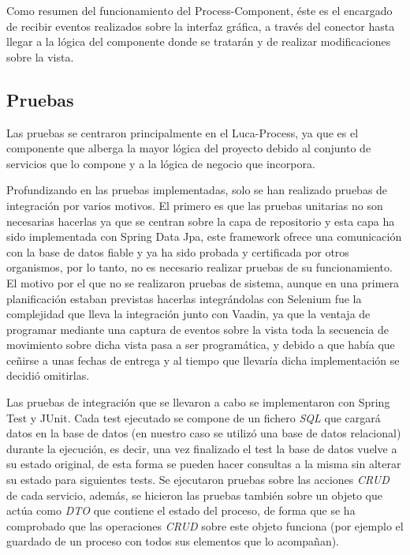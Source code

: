 Como resumen del funcionamiento del Process-Component, éste es el encargado de recibir eventos realizados sobre la interfaz gráfica, a través del conector hasta llegar a la lógica del componente donde se tratarán y de realizar modificaciones sobre la vista.

	
\subsection{Pruebas}
	
	
	Las pruebas se centraron principalmente en el Luca-Process, ya que es el componente que alberga la mayor lógica del proyecto debido al conjunto de servicios que lo compone y a la lógica de negocio que incorpora.
	
	
	Profundizando en las pruebas implementadas, solo se han realizado pruebas de integración por varios motivos. El primero es que las pruebas unitarias no son necesarias hacerlas ya que se centran sobre la capa de repositorio y esta capa ha sido implementada con Spring Data Jpa\cite{jpa}, este framework ofrece una comunicación con la base de datos fiable y ya ha sido probada y certificada por otros organismos, por lo tanto, no es necesario realizar pruebas de su funcionamiento. El motivo por el que no se realizaron pruebas de sistema, aunque en una primera planificación estaban previstas hacerlas integrándolas con Selenium\cite{selenium} fue la complejidad que lleva la integración junto con Vaadin\cite{vaadin}, ya que la ventaja de programar mediante una captura de eventos sobre la vista toda la secuencia de movimiento sobre dicha vista pasa a ser programática, y debido a que había que ceñirse a unas fechas de entrega y al tiempo que llevaría dicha implementación se decidió omitirlas.

	
	Las pruebas de integración que se llevaron a cabo se implementaron con Spring Test\cite{springTest} y JUnit\cite{junit}. Cada test ejecutado se compone de un fichero \emph{SQL} que cargará datos en la base de datos (en nuestro caso se utilizó una base de datos relacional) durante la ejecución, es decir, una vez finalizado el test la base de datos vuelve a su estado original, de esta forma se pueden hacer consultas a la misma sin alterar su estado para siguientes tests. Se ejecutaron pruebas sobre las acciones \emph{CRUD}\cite{crud} de cada servicio, además, se hicieron las pruebas también sobre un objeto que actúa como \emph{DTO}\cite{dto} que contiene el estado del proceso, de forma que se ha comprobado que las operaciones \emph{CRUD} sobre este objeto funciona (por ejemplo el guardado de un proceso con todos sus elementos que lo acompañan).




	 